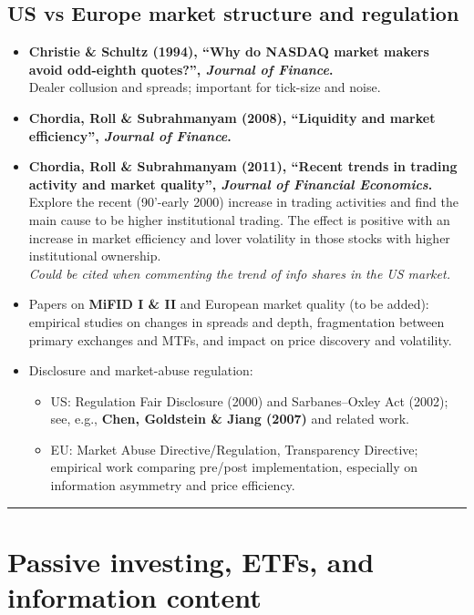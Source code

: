 \documentclass[11pt,a4paper]{article}
\begin{document}
\subsection{US vs Europe market structure and regulation}

\begin{itemize}
  \item \textbf{Christie \& Schultz (1994), ``Why do NASDAQ market makers avoid odd-eighth quotes?'', \emph{Journal of Finance}.}\\
  Dealer collusion and spreads; important for tick-size and noise.

  \item \textbf{Chordia, Roll \& Subrahmanyam (2008), ``Liquidity and market efficiency'', \emph{Journal of Finance}.}
  
  \item \textbf{Chordia, Roll \& Subrahmanyam (2011), ``Recent trends in trading activity and market quality'', \emph{Journal of Financial Economics}.}\\
  Explore the recent (90'-early 2000) increase in trading activities and find the main cause to be higher institutional trading. The effect is positive with an increase in market efficiency and lover volatility in those stocks with higher institutional ownership.\\
  \textit{Could be cited when commenting the trend of info shares in the US market.}

  \item Papers on \textbf{MiFID I \& II} and European market quality (to be added): empirical studies on changes in spreads and depth, fragmentation between primary exchanges and MTFs, and impact on price discovery and volatility.

  \item Disclosure and market-abuse regulation:
  \begin{itemize}
    \item US: Regulation Fair Disclosure (2000) and Sarbanes--Oxley Act (2002); see, e.g., \textbf{Chen, Goldstein \& Jiang (2007)} and related work.
    \item EU: Market Abuse Directive/Regulation, Transparency Directive; empirical work comparing pre/post implementation, especially on information asymmetry and price efficiency.
  \end{itemize}
\end{itemize}

\bigskip
\hrule
\bigskip

\section{Passive investing, ETFs, and information content}
\end{document}
